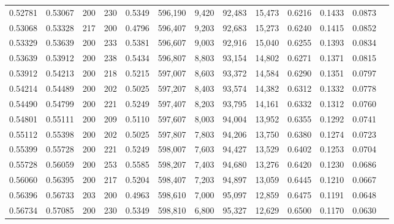 \begin{tabular}{rrrrrrrrrrrrr}
0.52781 & 0.53067 &    200 & 230 &                                     0.5349 & 596,190 &   9,420 &  92,483 &  15,473 & 0.6216 & 0.1433 & 0.0873 \\
0.53068 & 0.53328 &    217 & 200 &                                     0.4796 & 596,407 &   9,203 &  92,683 &  15,273 & 0.6240 & 0.1415 & 0.0852 \\
0.53329 & 0.53639 &    200 & 233 &                                     0.5381 & 596,607 &   9,003 &  92,916 &  15,040 & 0.6255 & 0.1393 & 0.0834 \\
0.53639 & 0.53912 &    200 & 238 &                                     0.5434 & 596,807 &   8,803 &  93,154 &  14,802 & 0.6271 & 0.1371 & 0.0815 \\
0.53912 & 0.54213 &    200 & 218 &                                     0.5215 & 597,007 &   8,603 &  93,372 &  14,584 & 0.6290 & 0.1351 & 0.0797 \\
0.54214 & 0.54489 &    200 & 202 &                                     0.5025 & 597,207 &   8,403 &  93,574 &  14,382 & 0.6312 & 0.1332 & 0.0778 \\
0.54490 & 0.54799 &    200 & 221 &                                     0.5249 & 597,407 &   8,203 &  93,795 &  14,161 & 0.6332 & 0.1312 & 0.0760 \\
0.54801 & 0.55111 &    200 & 209 &                                     0.5110 & 597,607 &   8,003 &  94,004 &  13,952 & 0.6355 & 0.1292 & 0.0741 \\
0.55112 & 0.55398 &    200 & 202 &                                     0.5025 & 597,807 &   7,803 &  94,206 &  13,750 & 0.6380 & 0.1274 & 0.0723 \\
0.55399 & 0.55728 &    200 & 221 &                                     0.5249 & 598,007 &   7,603 &  94,427 &  13,529 & 0.6402 & 0.1253 & 0.0704 \\
0.55728 & 0.56059 &    200 & 253 &                                     0.5585 & 598,207 &   7,403 &  94,680 &  13,276 & 0.6420 & 0.1230 & 0.0686 \\
0.56060 & 0.56395 &    200 & 217 &                                     0.5204 & 598,407 &   7,203 &  94,897 &  13,059 & 0.6445 & 0.1210 & 0.0667 \\
0.56396 & 0.56733 &    203 & 200 &                                     0.4963 & 598,610 &   7,000 &  95,097 &  12,859 & 0.6475 & 0.1191 & 0.0648 \\
0.56734 & 0.57085 &    200 & 230 &                                     0.5349 & 598,810 &   6,800 &  95,327 &  12,629 & 0.6500 & 0.1170 & 0.0630 \\

\end{tabular}

